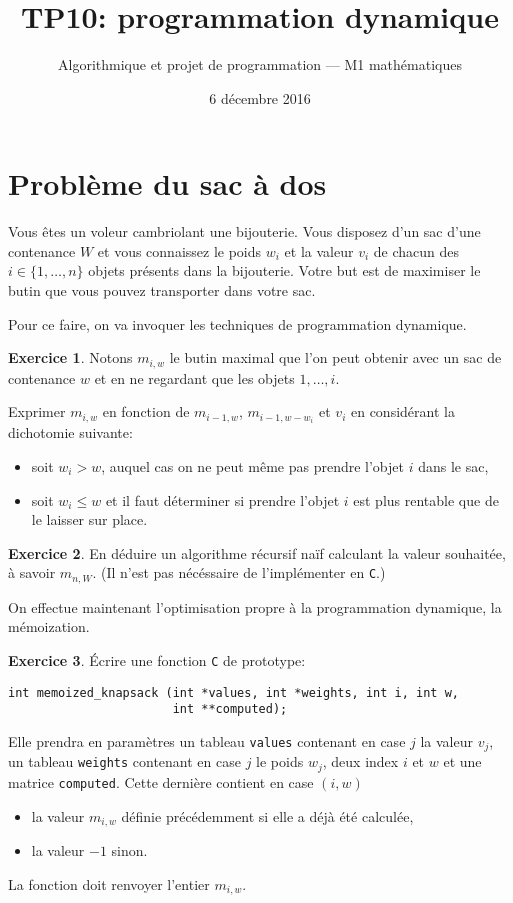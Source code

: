 \documentclass[french,a4paper]{article}
\title{\sffamily TP10: programmation dynamique}%
\date{6 décembre 2016}%
\author{Algorithmique et projet de programmation --- M1
  mathématiques}%
\theoremstyle{definition}
\newtheorem{exercise}{Exercice}
\theoremstyle{remark}
\newcommand{\inlinec}[1]{\lstinline[style=C]°#1°}
\begin{document}
\maketitle

\section{Problème du sac à dos}
\label{sec:knapsack}

Vous êtes un voleur cambriolant une bijouterie. Vous disposez d'un sac
d'une contenance $W$ et vous connaissez le poids $w_i$ et la valeur
$v_i$ de chacun des $i\in \{1,\dots, n\}$ objets présents dans la
bijouterie. Votre but est de maximiser le butin que vous pouvez
transporter dans votre sac.

Pour ce faire, on va invoquer les techniques de programmation
dynamique.

\begin{exercise}
  Notons $m_{i,w}$ le butin maximal que l'on peut obtenir avec un sac
  de contenance $w$ et en ne regardant que les objets $1,\dots,i$.

  Exprimer $m_{i,w}$ en fonction de $m_{i-1,w}$, $m_{i-1,w-w_i}$ et
  $v_i$ en considérant la dichotomie suivante:
  \begin{itemize}
  \item soit $w_i > w$, auquel cas on ne peut même pas prendre l'objet
    $i$ dans le sac,
  \item soit $w_i \leq w$ et il faut déterminer si prendre l'objet $i$
    est plus rentable que de le laisser sur place.
  \end{itemize}
\end{exercise}

\begin{exercise}
  En déduire un algorithme récursif naïf calculant la valeur
  souhaitée, à savoir $m_{n,W}$. (Il n'est pas nécéssaire de
  l'implémenter en {\tt C}.)
\end{exercise}

On effectue maintenant l'optimisation propre à la programmation
dynamique, la mémoization.

\begin{exercise}
  \'Ecrire une fonction {\tt C} de prototype:
\begin{lstlisting}
int memoized_knapsack (int *values, int *weights, int i, int w,
                       int **computed);
\end{lstlisting}
  Elle prendra en paramètres un tableau \inlinec{values} contenant en
  case $j$ la valeur $v_j$, un tableau \inlinec{weights} contenant en
  case $j$ le poids $w_j$, deux index $i$ et $w$ et une matrice
  \inlinec{computed}. Cette dernière contient en case $(i,w)$
  \begin{itemize}
  \item la valeur $m_{i,w}$ définie précédemment si elle a déjà été calculée,
  \item la valeur $-1$ sinon.
  \end{itemize}
  La fonction doit renvoyer l'entier $m_{i,w}$.
\end{exercise}
\end{document}
